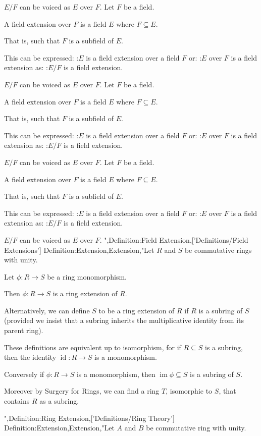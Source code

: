 $E / F$ can be voiced as $E$ over $F$.
Let $F$ be a field.


A field extension over $F$ is a field $E$ where $F \subseteq E$.

That is, such that $F$ is a subfield of $E$.


This can be expressed:
:$E$ is a field extension over a field $F$
or:
:$E$ over $F$ is a field extension 
as:
:$E / F$ is a field extension.  


$E / F$ can be voiced as $E$ over $F$.
Let $F$ be a field.


A field extension over $F$ is a field $E$ where $F \subseteq E$.

That is, such that $F$ is a subfield of $E$.


This can be expressed:
:$E$ is a field extension over a field $F$
or:
:$E$ over $F$ is a field extension 
as:
:$E / F$ is a field extension.  


$E / F$ can be voiced as $E$ over $F$.
Let $F$ be a field.


A field extension over $F$ is a field $E$ where $F \subseteq E$.

That is, such that $F$ is a subfield of $E$.


This can be expressed:
:$E$ is a field extension over a field $F$
or:
:$E$ over $F$ is a field extension 
as:
:$E / F$ is a field extension.  


$E / F$ can be voiced as $E$ over $F$.
",Definition:Field Extension,['Definitions/Field Extensions']
Definition:Extension,Extension,"Let $R$ and $S$ be commutative rings with unity.

Let $\phi : R \to S$ be a ring monomorphism.

Then $\phi : R \to S$ is a ring extension of $R$.


Alternatively, we can define $S$ to be a ring extension of $R$ if $R$ is a subring of $S$ (provided we insist that a subring inherits the multiplicative identity from its parent ring).


These definitions are equivalent up to isomorphism, for if $R \subseteq S$ is a subring, then the identity $\operatorname{id} : R \to S$ is a monomorphism.

Conversely if $\phi : R \to S$ is a monomorphism, then $\operatorname{im}\phi \subseteq S$ is a subring of $S$.

Moreover by Surgery for Rings, we can find a ring $T$, isomorphic to $S$, that contains $R$ as a subring.

",Definition:Ring Extension,['Definitions/Ring Theory']
Definition:Extension,Extension,"Let $A$ and $B$ be commutative ring with unity.

